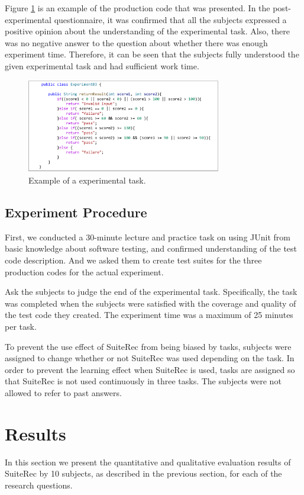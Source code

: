 \documentclass[conference]{IEEEtran}
\begin{document}
Figure \ref{fig4} is an example of the production code that was presented. In the post-experimental questionnaire, it was confirmed that all the subjects expressed a positive opinion about the understanding of the experimental task. Also, there was no negative answer to the question about whether there was enough experiment time. Therefore, it can be seen that the subjects fully understood the given experimental task and had sufficient work time.


\begin{figure}[htbp]
\centerline{\includegraphics[width=8.5cm]{task.pdf}}
\caption{Example of a experimental task.}
\label{fig4}
\end{figure}

\subsection{Experiment Procedure}
First, we conducted a 30-minute lecture and practice task on using JUnit from basic knowledge about software testing, and confirmed understanding of the test code description. And we asked them to create test suites for the three production codes for the actual experiment.

Ask the subjects to judge the end of the experimental task. Specifically, the task was completed when the subjects were satisfied with the coverage and quality of the test code they created. The experiment time was a maximum of 25 minutes per task.

To prevent the use effect of SuiteRec from being biased by tasks, subjects were assigned to change whether or not SuiteRec was used depending on the task. In order to prevent the learning effect when SuiteRec is used, tasks are assigned so that SuiteRec is not used continuously in three tasks. The subjects were not allowed to refer to past answers.

\section{Results}
In this section we present the quantitative and qualitative evaluation results of SuiteRec by 10 subjects, as described in the previous section, for each of the research questions.
\end{document}
